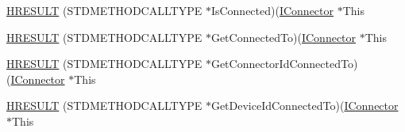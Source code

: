 \begin{DoxyCompactItemize}
\item 
\hyperlink{struct_i_connector_vtbl_abec2a1af9ff5f6dc84e5516f2a712e0f}{H\+R\+E\+S\+U\+LT} (S\+T\+D\+M\+E\+T\+H\+O\+D\+C\+A\+L\+L\+T\+Y\+PE $\ast$Is\+Connected)(\hyperlink{devicetopology_8h_a51f898e3bb3480805837711f3fcf328b}{I\+Connector} $\ast$This
\item 
\hyperlink{struct_i_connector_vtbl_a891f70f29c85cb8bd8f714fd15a99b02}{H\+R\+E\+S\+U\+LT} (S\+T\+D\+M\+E\+T\+H\+O\+D\+C\+A\+L\+L\+T\+Y\+PE $\ast$Get\+Connected\+To)(\hyperlink{devicetopology_8h_a51f898e3bb3480805837711f3fcf328b}{I\+Connector} $\ast$This
\item 
\hyperlink{struct_i_connector_vtbl_ae1020c9f173ae128ab0dbb3e26ea2856}{H\+R\+E\+S\+U\+LT} (S\+T\+D\+M\+E\+T\+H\+O\+D\+C\+A\+L\+L\+T\+Y\+PE $\ast$Get\+Connector\+Id\+Connected\+To)(\hyperlink{devicetopology_8h_a51f898e3bb3480805837711f3fcf328b}{I\+Connector} $\ast$This
\item 
\hyperlink{struct_i_connector_vtbl_a758a9680fdc2620c476bf786879922dd}{H\+R\+E\+S\+U\+LT} (S\+T\+D\+M\+E\+T\+H\+O\+D\+C\+A\+L\+L\+T\+Y\+PE $\ast$Get\+Device\+Id\+Connected\+To)(\hyperlink{devicetopology_8h_a51f898e3bb3480805837711f3fcf328b}{I\+Connector} $\ast$This
\end{DoxyCompactItemize}
